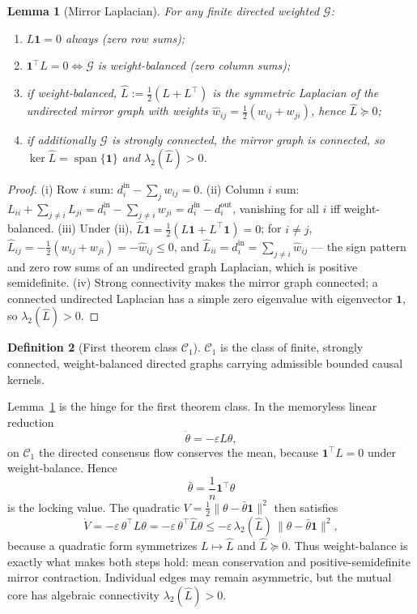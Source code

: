 \documentclass[11pt,a4paper]{article}
\theoremstyle{definition}
\newtheorem{definition}{Definition}[section]
\theoremstyle{plain}
\newtheorem{lemma}[definition]{Lemma}
\theoremstyle{remark}
\begin{document}
\begin{lemma}[Mirror Laplacian]\label{lem:mirror}
For any finite directed weighted $\mathcal G$:
\begin{enumerate}[label=\textup{(\roman*)},leftmargin=1.2cm]
\item $L\mathbf 1=0$ always (zero row sums);
\item $\mathbf 1^\top L=0\iff\mathcal G$ is weight-balanced (zero column sums);
\item if weight-balanced, $\hat L:=\tfrac12(L+L^\top)$ is the symmetric Laplacian of the undirected mirror graph with weights $\hat w_{ij}=\tfrac12(w_{ij}+w_{ji})$, hence $\hat L\succeq0$;
\item if additionally $\mathcal G$ is strongly connected, the mirror graph is connected, so $\ker\hat L=\operatorname{span}\{\mathbf 1\}$ and $\lambda_2(\hat L)>0$.
\end{enumerate}
\end{lemma}
\begin{proof}
(i) Row $i$ sum: $d_i^{\mathrm{in}}-\sum_j w_{ij}=0$. (ii) Column $i$ sum:
$L_{ii}+\sum_{j\ne i}L_{ji}=d_i^{\mathrm{in}}-\sum_{j\ne i}w_{ji}=d_i^{\mathrm{in}}-d_i^{\mathrm{out}}$,
vanishing for all $i$ iff weight-balanced. (iii) Under (ii),
$\hat L\mathbf 1=\tfrac12(L\mathbf 1+L^\top\mathbf 1)=0$; for $i\ne j$,
$\hat L_{ij}=-\tfrac12(w_{ij}+w_{ji})=-\hat w_{ij}\le0$, and
$\hat L_{ii}=d_i^{\mathrm{in}}=\sum_{j\ne i}\hat w_{ij}$ --- the sign pattern and zero
row sums of an undirected graph Laplacian, which is positive semidefinite. (iv)
Strong connectivity makes the mirror graph connected; a connected undirected
Laplacian has a simple zero eigenvalue with eigenvector $\mathbf 1$, so
$\lambda_2(\hat L)>0$. \qedhere
\end{proof}

\begin{definition}[First theorem class $\mathcal C_1$]
$\mathcal C_1$ is the class of finite, strongly connected, weight-balanced directed
graphs carrying admissible bounded causal kernels.
\end{definition}

Lemma~\ref{lem:mirror} is the hinge for the first theorem class. In the memoryless
linear reduction
\[
\dot\theta=-\varepsilon L\theta,
\]
on $\mathcal C_1$ the directed consensus flow conserves the mean, because
$\mathbf 1^\top L=0$ under weight-balance. Hence
\[
\bar\theta=\frac1n\mathbf 1^\top\theta
\]
is the locking value. The quadratic $V=\tfrac12\|\theta-\bar\theta\mathbf 1\|^2$ then
satisfies
\[
\dot V=-\varepsilon\,\theta^\top L\theta=-\varepsilon\,\theta^\top\hat L\theta
\le-\varepsilon\,\lambda_2(\hat L)\,\|\theta-\bar\theta\mathbf 1\|^2,
\]
because a quadratic form symmetrizes $L\mapsto\hat L$ and $\hat L\succeq0$. Thus
weight-balance is exactly what makes both steps hold: mean conservation and
positive-semidefinite mirror contraction. Individual edges may remain asymmetric,
but the mutual core has algebraic connectivity $\lambda_2(\hat L)>0$.
\end{document}
